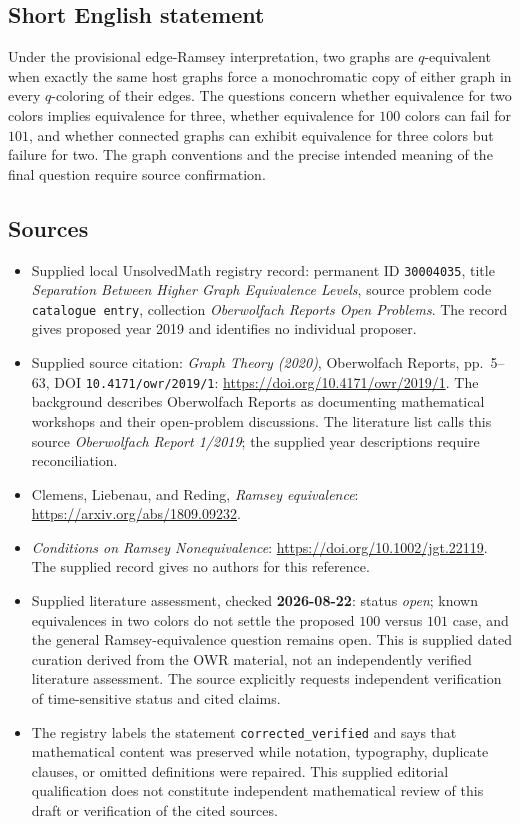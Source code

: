 \documentclass[11pt]{article}
\begin{document}
\subsection{Short English statement}
Under the provisional edge-Ramsey interpretation, two graphs are $q$-equivalent when exactly the same host graphs force a monochromatic copy of either graph in every $q$-coloring of their edges. The questions concern whether equivalence for two colors implies equivalence for three, whether equivalence for $100$ colors can fail for $101$, and whether connected graphs can exhibit equivalence for three colors but failure for two. The graph conventions and the precise intended meaning of the final question require source confirmation.
\subsection{Sources}
\begin{itemize}
\item Supplied local UnsolvedMath registry record: permanent ID \texttt{30004035}, title \emph{Separation Between Higher Graph Equivalence Levels}, source problem code \texttt{catalogue entry}, collection \emph{Oberwolfach Reports Open Problems}. The record gives proposed year 2019 and identifies no individual proposer.
\item Supplied source citation: \emph{Graph Theory (2020)}, Oberwolfach Reports, pp.\ 5--63, DOI \texttt{10.4171/owr/2019/1}: \url{https://doi.org/10.4171/owr/2019/1}. The background describes Oberwolfach Reports as documenting mathematical workshops and their open-problem discussions. The literature list calls this source \emph{Oberwolfach Report 1/2019}; the supplied year descriptions require reconciliation.
\item Clemens, Liebenau, and Reding, \emph{Ramsey equivalence}: \url{https://arxiv.org/abs/1809.09232}.
\item \emph{Conditions on Ramsey Nonequivalence}: \url{https://doi.org/10.1002/jgt.22119}. The supplied record gives no authors for this reference.
\item Supplied literature assessment, checked \textbf{2026-08-22}: status \emph{open}; known equivalences in two colors do not settle the proposed $100$ versus $101$ case, and the general Ramsey-equivalence question remains open. This is supplied dated curation derived from the OWR material, not an independently verified literature assessment. The source explicitly requests independent verification of time-sensitive status and cited claims.
\item The registry labels the statement \texttt{corrected\_verified} and says that mathematical content was preserved while notation, typography, duplicate clauses, or omitted definitions were repaired. This supplied editorial qualification does not constitute independent mathematical review of this draft or verification of the cited sources.
\end{itemize}
\end{document}
